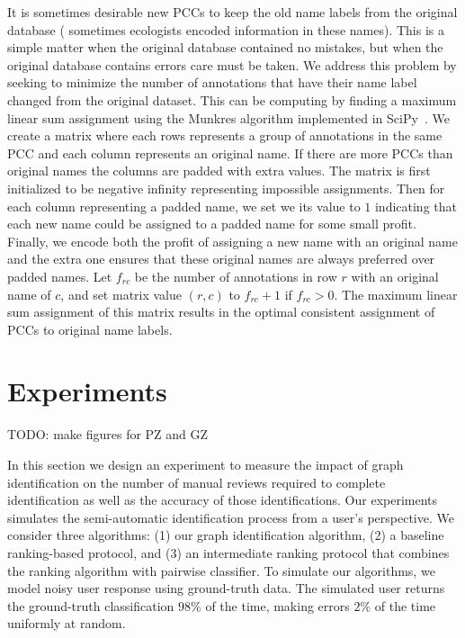 It is sometimes desirable new PCCs to keep the old name labels from the original database (\eg{} sometimes ecologists
encoded information in these names). This is a simple matter when the original database contained no mistakes, but when
the original database contains errors care must be taken. We address this problem by seeking to minimize the number of
annotations that have their name label changed from the original dataset. This can be computing by finding a maximum
linear sum assignment using the Munkres algorithm implemented in SciPy~\cite{eric_jones_scipy_2001}. We create a matrix
where each rows represents a group of annotations in the same PCC and each column represents an original name. If there
are more PCCs than original names the columns are padded with extra values. The matrix is first initialized to be
negative infinity representing impossible assignments. Then for each column representing a padded name, we set we its
value to $1$ indicating that each new name could be assigned to a padded name for some small profit. Finally, we encode
both the profit of assigning a new name with an original name and the extra one ensures that these original names are
always preferred over padded names. Let $f_{rc}$ be the number of annotations in row $r$ with an original name of $c$,
and set matrix value $(r, c)$ to $f_{rc} + 1$ if $f_{rc} > 0$. The maximum linear sum assignment of this matrix results
in the optimal consistent assignment of PCCs to original name labels.
  
  
\section{Experiments}\label{sec:graphexpt}

    TODO: make figures for PZ and GZ

    In this section we design an experiment to measure the impact of graph identification on the number of manual
      reviews required to complete identification as well as the accuracy of those identifications.
    Our experiments simulates the semi-automatic identification process from a user's perspective.
    We consider three algorithms:
    (1) our graph identification algorithm,
    (2) a baseline ranking-based protocol, and
    (3) an intermediate ranking protocol that combines the ranking algorithm with pairwise classifier.
    To simulate our algorithms, we model noisy user response using ground-truth data.
    The simulated user returns the ground-truth classification $98\percent$ of the time, making errors
      $2\percent$ of the time uniformly at random.


